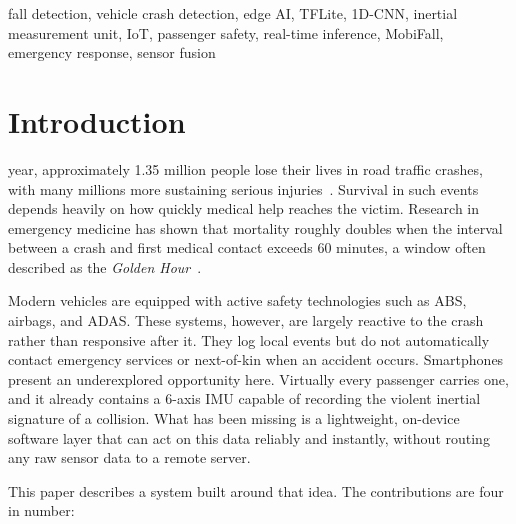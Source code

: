 \documentclass[journal]{IEEEtran}
\begin{document}
\begin{IEEEkeywords}
fall detection, vehicle crash detection, edge AI, TFLite, 1D-CNN,
inertial measurement unit, IoT, passenger safety, real-time inference,
MobiFall, emergency response, sensor fusion
\end{IEEEkeywords}


\IEEEpeerreviewmaketitle


\section{Introduction}

 year, approximately 1.35 million people lose their lives
in road traffic crashes, with many millions more sustaining serious
injuries~\cite{who_road_safety}. Survival in such events depends heavily on
how quickly medical help reaches the victim. Research in emergency medicine has
shown that mortality roughly doubles when the interval between a crash and first
medical contact exceeds 60 minutes, a window often described as the
\textit{Golden Hour}~\cite{golden_hour}.

Modern vehicles are equipped with active safety technologies such as ABS,
airbags, and ADAS. These systems, however, are largely reactive to the crash
rather than responsive after it. They log local events but do not
automatically contact emergency services or next-of-kin when an accident occurs.
Smartphones present an underexplored opportunity here. Virtually every passenger
carries one, and it already contains a 6-axis IMU capable of recording the
violent inertial signature of a collision. What has been missing is a
lightweight, on-device software layer that can act on this data reliably and
instantly, without routing any raw sensor data to a remote server.

This paper describes a system built around that idea. The contributions are
four in number:
\end{document}
